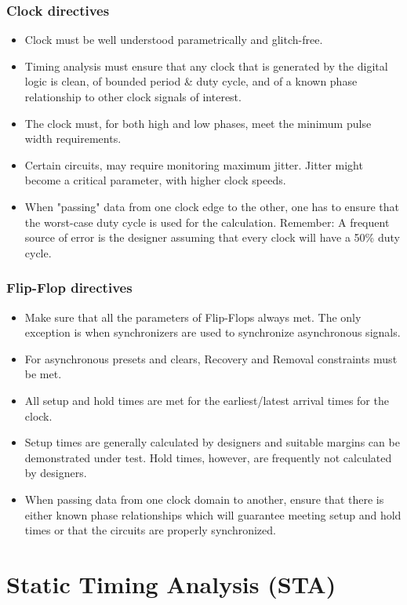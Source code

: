 \subsubsection{Clock directives}
\begin{itemize}
    \item Clock must be well understood parametrically and glitch-free.
    \item Timing analysis must ensure that any clock that is generated by the digital logic is clean, of bounded period \& duty cycle, and of a known phase relationship to other clock signals of interest.
    \item The clock must, for both high and low phases, meet the minimum pulse width requirements.
    \item Certain circuits, may require monitoring maximum jitter. Jitter might become a critical parameter, with higher clock speeds.
    \item When "passing" data from one clock edge to the other, one has to ensure that the worst-case duty cycle is used for the calculation. Remember: A frequent source of error is the designer assuming that every clock will have a 50\% duty cycle.
\end{itemize}
\clearpage
\subsubsection{Flip-Flop directives}
\begin{itemize}
    \item Make sure that all the parameters of Flip-Flops always met. The only exception is when synchronizers are used to synchronize asynchronous signals.
    \item For asynchronous presets and clears, Recovery and Removal constraints must be met.
    \item All setup and hold times are met for the earliest/latest arrival times for the clock.
    \item Setup times are generally calculated by designers and suitable margins can be demonstrated under test. Hold times, however, are frequently not calculated by designers.
    \item When passing data from one clock domain to another, ensure that there is either known phase relationships which will guarantee meeting setup and hold times or that the circuits are properly synchronized.    
\end{itemize}

\section{Static Timing Analysis (STA)}
